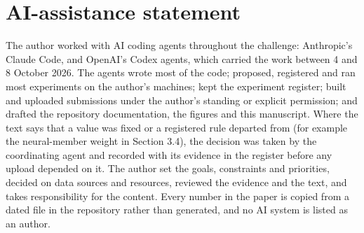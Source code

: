 \documentclass[11pt,a4paper]{article}
\begin{document}
\section*{AI-assistance statement}\label{ai-assistance-statement}

The author worked with AI coding agents throughout the challenge: Anthropic's Claude Code, and OpenAI's Codex agents, which carried the work between 4 and 8 October 2026. The agents wrote most of the code; proposed, registered and ran most experiments on the author's machines; kept the experiment register; built and uploaded submissions under the author's standing or explicit permission; and drafted the repository documentation, the figures and this manuscript. Where the text says that a value was fixed or a registered rule departed from (for example the neural-member weight in Section 3.4), the decision was taken by the coordinating agent and recorded with its evidence in the register before any upload depended on it. The author set the goals, constraints and priorities, decided on data sources and resources, reviewed the evidence and the text, and takes responsibility for the content. Every number in the paper is copied from a dated file in the repository rather than generated, and no AI system is listed as an author.

\printbibliography
\end{document}
